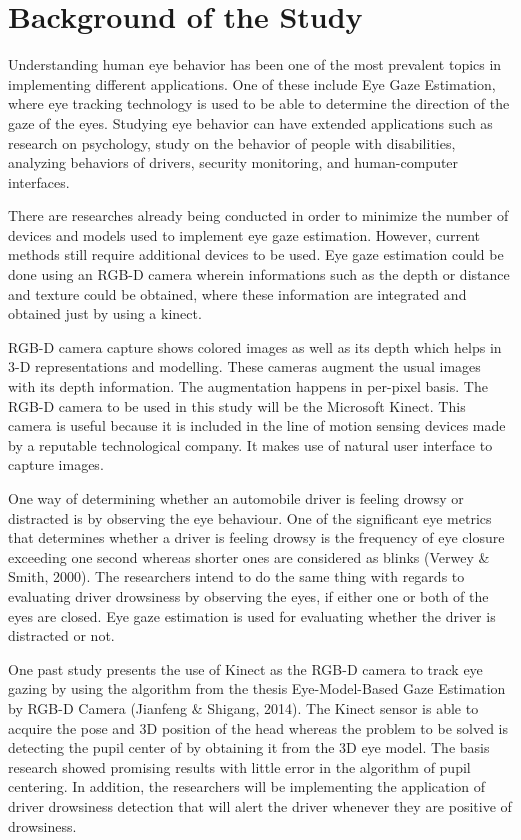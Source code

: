 \section{Background of the Study}


Understanding human eye behavior has been one of the most prevalent topics in implementing different applications. One of these include Eye Gaze Estimation, where eye tracking technology is used to be able to determine the direction of the gaze of the eyes. Studying eye behavior can have extended applications such as research on psychology, study on the behavior of people with disabilities, analyzing behaviors of drivers, security monitoring, and human-computer interfaces.

There are researches already being conducted in order to minimize the number of devices and models used to implement eye gaze estimation. However, current methods still require additional devices to be used. Eye gaze estimation could be done using an RGB-D camera wherein informations such as the depth or distance and texture could be obtained, where these information are integrated and obtained just by using a kinect.

RGB-D camera capture shows colored images as well as its depth which helps in 3-D representations and modelling. These cameras augment the usual images with its depth information. The augmentation happens in per-pixel basis. The RGB-D camera to be used in this study will be the Microsoft Kinect. This camera is useful because it is included in the line of motion sensing devices made by a reputable technological company. It makes use of natural user interface to capture images.

One way of determining whether an automobile driver is feeling drowsy or distracted is by observing the eye behaviour. One of the significant eye metrics that determines whether a driver is feeling drowsy is the frequency of eye closure exceeding one second whereas shorter ones are considered as blinks (Verwey \& Smith, 2000). The researchers intend to do the same thing with regards to evaluating driver drowsiness by observing the eyes, if either one or both of the eyes are closed. Eye gaze estimation is used for evaluating whether the driver is distracted or not.

One past study presents the use of Kinect as the RGB-D camera to track eye gazing by using the algorithm from the thesis Eye-Model-Based Gaze Estimation by RGB-D Camera (Jianfeng \& Shigang, 2014). The Kinect sensor is able to acquire the pose and 3D position of the head whereas the problem to be solved is detecting the pupil center of by obtaining it from the 3D eye model. The basis research showed promising results with little error in the algorithm of pupil centering. In addition, the researchers will be implementing the application of driver drowsiness detection that will alert the driver whenever they are positive of drowsiness.

